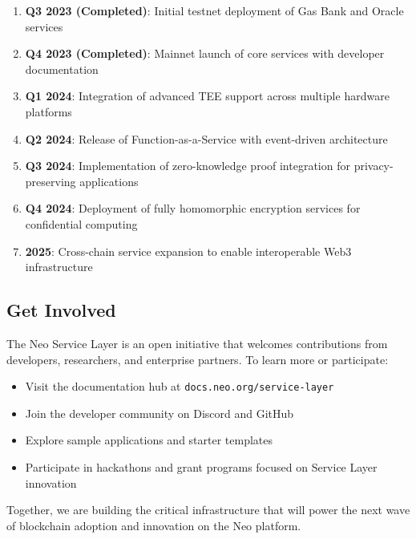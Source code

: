 \documentclass[11pt]{article}
\begin{document}
\begin{enumerate}
    \item \textbf{Q3 2023 (Completed)}: Initial testnet deployment of Gas Bank and Oracle services
    
    \item \textbf{Q4 2023 (Completed)}: Mainnet launch of core services with developer documentation
    
    \item \textbf{Q1 2024}: Integration of advanced TEE support across multiple hardware platforms
    
    \item \textbf{Q2 2024}: Release of Function-as-a-Service with event-driven architecture
    
    \item \textbf{Q3 2024}: Implementation of zero-knowledge proof integration for privacy-preserving applications
    
    \item \textbf{Q4 2024}: Deployment of fully homomorphic encryption services for confidential computing
    
    \item \textbf{2025}: Cross-chain service expansion to enable interoperable Web3 infrastructure
\end{enumerate}

\subsection{Get Involved}

The Neo Service Layer is an open initiative that welcomes contributions from developers, researchers, and enterprise partners. To learn more or participate:

\begin{itemize}
    \item Visit the documentation hub at \texttt{docs.neo.org/service-layer}
    \item Join the developer community on Discord and GitHub
    \item Explore sample applications and starter templates
    \item Participate in hackathons and grant programs focused on Service Layer innovation
\end{itemize}

Together, we are building the critical infrastructure that will power the next wave of blockchain adoption and innovation on the Neo platform.
\end{document}
